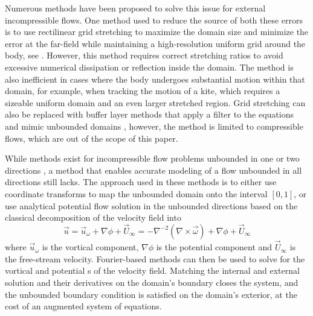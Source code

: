 \documentclass[preprint,12pt]{elsarticle}
\begin{document}
Numerous methods have been proposed to solve this issue for external incompressible flows. One method used to reduce the source of both these errors is to use rectilinear grid stretching to maximize the domain size and minimize the error at the far-field while maintaining a high-resolution uniform grid around the body, see \cite{Maertens2015, Lauber2022}. However, this method requires correct stretching ratios to avoid excessive numerical dissipation or reflection inside the domain. The method is also inefficient in cases where the body undergoes substantial motion within that domain, for example, when tracking the motion of a kite, which requires a sizeable uniform domain and an even larger stretched region. Grid stretching can also be replaced with buffer layer methods that apply a filter to the equations and mimic unbounded domains \cite{Colonius2002ADomains}, however, the method is limited to compressible flows, which are out of the scope of this paper.

While methods exist for incompressible flow problems unbounded in one \cite{Grosch1977NumericalTransforms, Levy2022SolvingMethod} or two directions \cite{Rennich1997NumericalDirections}, a method that enables accurate modeling of a flow unbounded in all directions still lacks. The approach used in these methods is to either use coordinate transforms to map the unbounded domain onto the interval $[0,1]$, or use analytical potential flow solution in the unbounded directions based on the classical decomposition of the velocity field into
\begin{equation}\label{eq:u_vort}
    \vec{u} = \vec{u}_\omega + \nabla\phi + \vec{U}_\infty = -\nabla^{-2}\left(\nabla \times \vec{\omega}\right) + \nabla\phi + \vec{U}_\infty
\end{equation}
where $\vec{u}_\omega$ is the vortical component, $\nabla\phi$ is the potential component and $\vec{U}_\infty$ is the free-stream velocity. Fourier-based methods can then be used to solve for the vortical and potential s of the velocity field. Matching the internal and external solution and their derivatives on the domain's boundary closes the system, and the unbounded boundary condition is satisfied on the domain's exterior, at the cost of an augmented system of equations.
\end{document}
